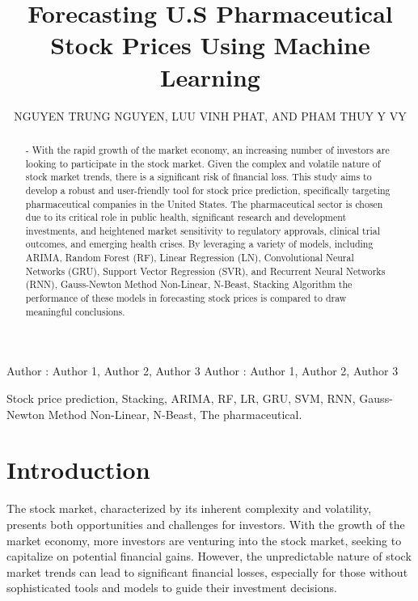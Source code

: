 \documentclass{ieeeojies}
\begin{document}
\title{Forecasting U.S Pharmaceutical Stock Prices Using Machine Learning}

\author{\uppercase{Nguyen Trung Nguyen},
\uppercase{Luu Vinh Phat, and Pham Thuy Y Vy}}

\address[1]{Faculty of Information Systems, University of Information Technology, (e-mail: 20521678@gm.uit.edu.vn)}
\address[2]{Faculty of Information Systems, University of Information Technology, (e-mail: 20521733@gm.uit.edu.vn)}
\address[3]{Faculty of Information Systems, University of Information Technology, (e-mail: 20522183@gm.uit.edu.vn)}

\markboth
{Author \headeretal: Author 1, Author 2, Author 3}
{Author \headeretal: Author 1, Author 2, Author 3}

\begin{abstract}- With the rapid growth of the market economy, an increasing number of investors are looking to participate in the stock market. Given the complex and volatile nature of stock market trends, there is a significant risk of financial loss. This study aims to develop a robust and user-friendly tool for stock price prediction, specifically targeting pharmaceutical companies in the United States. The pharmaceutical sector is chosen due to its critical role in public health, significant research and development investments, and heightened market sensitivity to regulatory approvals, clinical trial outcomes, and emerging health crises. By leveraging a variety of models, including ARIMA, Random Forest (RF), Linear Regression (LN), Convolutional Neural Networks (GRU), Support Vector Regression (SVR), and Recurrent Neural Networks (RNN), Gauss-Newton Method Non-Linear, N-Beast, Stacking Algorithm the performance of these models in forecasting stock prices is compared to draw meaningful conclusions. 
\end{abstract}

\begin{keywords}
Stock price prediction, Stacking, ARIMA, RF, LR, GRU, SVM, RNN, Gauss-Newton Method Non-Linear, N-Beast, The pharmaceutical. 
\end{keywords}

\titlepgskip=-15pt

\maketitle

\section{Introduction}
\label{sec:introduction}
The stock market, characterized by its inherent complexity and volatility, presents both opportunities and challenges for investors. With the growth of the market economy, more investors are venturing into the stock market, seeking to capitalize on potential financial gains. However, the unpredictable nature of stock market trends can lead to significant financial losses, especially for those without sophisticated tools and models to guide their investment decisions.
\end{document}
